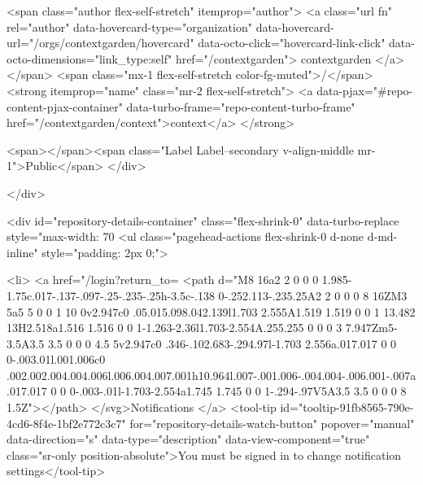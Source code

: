     <span class="author flex-self-stretch" itemprop="author">
      <a class="url fn" rel="author" data-hovercard-type="organization" data-hovercard-url="/orgs/contextgarden/hovercard" data-octo-click="hovercard-link-click" data-octo-dimensions="link_type:self" href="/contextgarden">
        contextgarden
</a>    </span>
    <span class="mx-1 flex-self-stretch color-fg-muted">/</span>
    <strong itemprop="name" class="mr-2 flex-self-stretch">
      <a data-pjax="#repo-content-pjax-container" data-turbo-frame="repo-content-turbo-frame" href="/contextgarden/context">context</a>
    </strong>

    <span></span><span class="Label Label--secondary v-align-middle mr-1">Public</span>
  </div>


        </div>

        <div id="repository-details-container" class="flex-shrink-0" data-turbo-replace style="max-width: 70%
            <ul class="pagehead-actions flex-shrink-0 d-none d-md-inline" style="padding: 2px 0;">
    
      

  <li>
            <a href="/login?return_to=%
    <path d="M8 16a2 2 0 0 0 1.985-1.75c.017-.137-.097-.25-.235-.25h-3.5c-.138 0-.252.113-.235.25A2 2 0 0 0 8 16ZM3 5a5 5 0 0 1 10 0v2.947c0 .05.015.098.042.139l1.703 2.555A1.519 1.519 0 0 1 13.482 13H2.518a1.516 1.516 0 0 1-1.263-2.36l1.703-2.554A.255.255 0 0 0 3 7.947Zm5-3.5A3.5 3.5 0 0 0 4.5 5v2.947c0 .346-.102.683-.294.97l-1.703 2.556a.017.017 0 0 0-.003.01l.001.006c0 .002.002.004.004.006l.006.004.007.001h10.964l.007-.001.006-.004.004-.006.001-.007a.017.017 0 0 0-.003-.01l-1.703-2.554a1.745 1.745 0 0 1-.294-.97V5A3.5 3.5 0 0 0 8 1.5Z"></path>
</svg>Notifications
</a>    <tool-tip id="tooltip-91fb8565-790e-4cd6-8f4e-1bf2e772c3c7" for="repository-details-watch-button" popover="manual" data-direction="s" data-type="description" data-view-component="true" class="sr-only position-absolute">You must be signed in to change notification settings</tool-tip>

